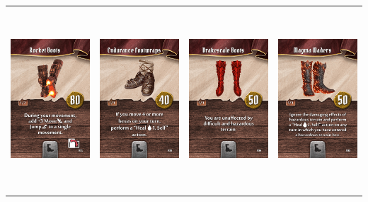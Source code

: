 \documentclass{minimal}
\begin{document}
{\begin{longtable}{llll}
\includegraphics[width=44mm,height=68mm]{./64-151/gh-096-rocket-boots.png} &
\includegraphics[width=44mm,height=68mm]{./64-151/gh-097-endurance-footwraps.png} &
\includegraphics[width=44mm,height=68mm]{./64-151/gh-098-drakescale-boots.png} &
\includegraphics[width=44mm,height=68mm]{./64-151/gh-099-magma-waders.png}\\ 

\end{longtable}}
\end{document}
